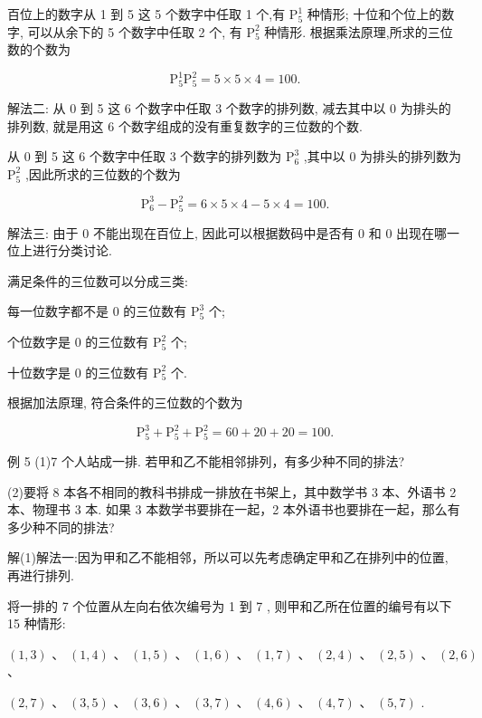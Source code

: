 \documentclass[10pt]{article}
\begin{document}
百位上的数字从 1 到 5 这 5 个数字中任取 1 个,有 \({\mathrm{P}}_{5}^{1}\) 种情形; 十位和个位上的数字, 可以从余下的 5 个数字中任取 2 个, 有 \({\mathrm{P}}_{5}^{2}\) 种情形. 根据乘法原理,所求的三位数的个数为

\[
{\mathrm{P}}_{5}^{1}{\mathrm{P}}_{5}^{2} = 5 \times  5 \times  4 = {100}.
\]

解法二: 从 0 到 5 这 6 个数字中任取 3 个数字的排列数, 减去其中以 0 为排头的排列数, 就是用这 6 个数字组成的没有重复数字的三位数的个数.

从 0 到 5 这 6 个数字中任取 3 个数字的排列数为 \({\mathrm{P}}_{6}^{3}\) ,其中以 0 为排头的排列数为 \({\mathrm{P}}_{5}^{2}\) ,因此所求的三位数的个数为

\[
{\mathrm{P}}_{6}^{3} - {\mathrm{P}}_{5}^{2} = 6 \times  5 \times  4 - 5 \times  4 = {100}.
\]

解法三: 由于 0 不能出现在百位上, 因此可以根据数码中是否有 0 和 0 出现在哪一位上进行分类讨论.

满足条件的三位数可以分成三类:

每一位数字都不是 0 的三位数有 \({\mathrm{P}}_{5}^{3}\) 个;

个位数字是 0 的三位数有 \({\mathrm{P}}_{5}^{2}\) 个;

十位数字是 0 的三位数有 \({\mathrm{P}}_{5}^{2}\) 个.

根据加法原理, 符合条件的三位数的个数为

\[
{\mathrm{P}}_{5}^{3} + {\mathrm{P}}_{5}^{2} + {\mathrm{P}}_{5}^{2} = {60} + {20} + {20} = {100}.
\]

例 5 (1)7 个人站成一排. 若甲和乙不能相邻排列，有多少种不同的排法?

(2)要将 8 本各不相同的教科书排成一排放在书架上，其中数学书 3 本、外语书 2 本、物理书 3 本. 如果 3 本数学书要排在一起，2 本外语书也要排在一起，那么有多少种不同的排法?

解(1)解法一:因为甲和乙不能相邻，所以可以先考虑确定甲和乙在排列中的位置, 再进行排列.

将一排的 7 个位置从左向右依次编号为 1 到 7 , 则甲和乙所在位置的编号有以下 15 种情形:

 \(\left( {1,3}\right) \text{ 、 }\left( {1,4}\right) \text{ 、 }\left( {1,5}\right) \text{ 、 }\left( {1,6}\right) \text{ 、 }\left( {1,7}\right) \text{ 、 }\left( {2,4}\right) \text{ 、 }\left( {2,5}\right) \text{ 、 }\left( {2,6}\right)\) 、

\(\left( {2,7}\right) \text{ 、 }\left( {3,5}\right) \text{ 、 }\left( {3,6}\right) \text{ 、 }\left( {3,7}\right) \text{ 、 }\left( {4,6}\right) \text{ 、 }\left( {4,7}\right) \text{ 、 }\left( {5,7}\right)\) .
\end{document}
